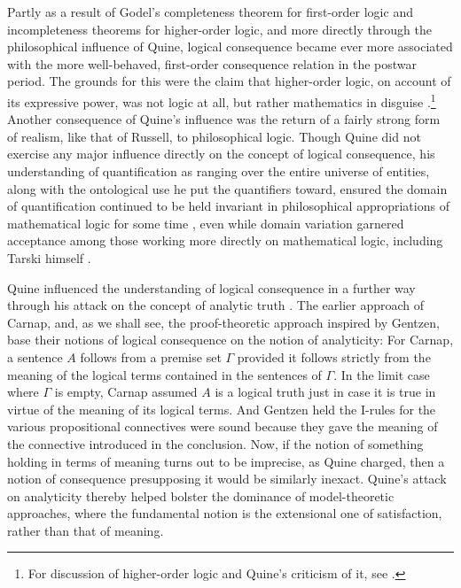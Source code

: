 \documentclass[]{article}
\begin{document}
Partly as a result of Godel's completeness theorem for first-order logic and incompleteness theorems for higher-order logic, and more directly through the philosophical influence of Quine, logical consequence became ever more associated with the more well-behaved, first-order consequence relation in the postwar period. The grounds for this were the claim that higher-order logic, on account of its expressive power, was not logic at all, but rather mathematics in disguise \cite[ch. 5]{Quine1986}.\footnote{For discussion of higher-order logic and Quine's criticism of it, see \cite{Shapiro2001}.} Another consequence of Quine's influence was the return of a fairly strong form of realism, like that of Russell, to philosophical logic. Though Quine did not exercise any major influence directly on the concept of logical consequence, his understanding of quantification as ranging over the entire universe of entities, along with the ontological use he put the quantifiers toward, ensured the domain of quantification continued to be held invariant in philosophical appropriations of mathematical logic for some time \cite[31-32]{Quine1948} \cite{Eder2016} \cite{Lewis1968}, even while domain variation garnered acceptance among those working more directly on mathematical logic, including Tarski himself \cite{Henkin1949} \cite{Kemeny1948} \cite{Kemeny1956} \cite{Tarski1953a}.

Quine influenced the understanding of logical consequence in a further way through his attack on the concept of analytic truth \cite{Quine1951} \cite{Quine1960a}. The earlier approach of Carnap, and, as we shall see, the proof-theoretic approach inspired by Gentzen, base their notions of logical consequence on the notion of analyticity: For Carnap, a sentence $A$ follows from a premise set $\Gamma$ provided it follows strictly from the meaning of the logical terms contained in the sentences of $\Gamma$. In the limit case where $\Gamma$ is empty, Carnap assumed $A$ is a logical truth just in case it is true in virtue of the meaning of its logical terms. And Gentzen held the I-rules for the various propositional connectives were sound because they gave the meaning of the connective introduced in the conclusion. Now, if the notion of something holding in terms of meaning turns out to be imprecise, as Quine charged, then a notion of consequence presupposing it would be similarly inexact. Quine's attack on analyticity thereby helped bolster the dominance of model-theoretic approaches, where the fundamental notion is the extensional one of satisfaction, rather than that of meaning.
\end{document}
